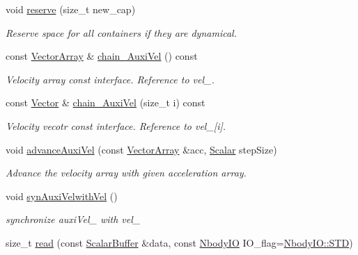 \begin{DoxyCompactItemize}
void \mbox{\hyperlink{class_space_h_1_1_vel_dep_chain_particles_a0257a89d0e3058624cc076c2956b94ea}{reserve}} (size\+\_\+t new\+\_\+cap)
\begin{DoxyCompactList}\small\item\em Reserve space for all containers if they are dynamical. \end{DoxyCompactList}\item 
const \mbox{\hyperlink{class_space_h_1_1_vel_indep_particles_aa9983058940249df8b00fa800e8cbad2}{Vector\+Array}} \& \mbox{\hyperlink{class_space_h_1_1_vel_dep_chain_particles_ab2ec7493ee6cb12ed77f6aac4f4e8660}{chain_\+Auxi\+Vel}} () const
\begin{DoxyCompactList}\small\item\em Velocity array const interface. Reference to vel\+\_\+. \end{DoxyCompactList}\item 
const \mbox{\hyperlink{class_space_h_1_1_vel_indep_particles_a61bbcfdb0dc7f99f3c68af69a755c935}{Vector}} \& \mbox{\hyperlink{class_space_h_1_1_vel_dep_chain_particles_a1f717dd8619e3237362bacd55623500c}{chain_\+Auxi\+Vel}} (size\+\_\+t i) const
\begin{DoxyCompactList}\small\item\em Velocity vecotr const interface. Reference to vel\+\_\+\mbox{[}i\mbox{]}. \end{DoxyCompactList}\item 
void \mbox{\hyperlink{class_space_h_1_1_vel_dep_chain_particles_a7dae0ccc9035be9e37e45d45b030a89c}{advance\+Auxi\+Vel}} (const \mbox{\hyperlink{class_space_h_1_1_vel_indep_particles_aa9983058940249df8b00fa800e8cbad2}{Vector\+Array}} \&acc, \mbox{\hyperlink{class_space_h_1_1_vel_indep_particles_aeb47d8131b30ed790320ff634f0d6af1}{Scalar}} step\+Size)
\begin{DoxyCompactList}\small\item\em Advance the velocity array with given acceleration array. \end{DoxyCompactList}\item 
void \mbox{\hyperlink{class_space_h_1_1_vel_dep_chain_particles_a0d32d36439671d1c2344178d1d548567}{syn\+Auxi\+Velwith\+Vel}} ()
\begin{DoxyCompactList}\small\item\em synchronize auxi\+Vel\+\_\+ with vel\+\_\+ \end{DoxyCompactList}\item 
size\+\_\+t \mbox{\hyperlink{class_space_h_1_1_vel_dep_chain_particles_a901445956f76ea38574b2df3c45c77a1}{read}} (const \mbox{\hyperlink{class_space_h_1_1_vel_indep_particles_abca40159a816385790d5a6fd19c1dc6d}{Scalar\+Buffer}} \&data, const \mbox{\hyperlink{namespace_space_h_a296a8bae763a754564bfdce216e31b59}{Nbody\+IO}} I\+O\+\_\+flag=\mbox{\hyperlink{namespace_space_h_a296a8bae763a754564bfdce216e31b59ac6ce23be5d350ce18a665427d2d950f7}{Nbody\+I\+O\+::\+S\+TD}})

\end{DoxyCompactItemize}
